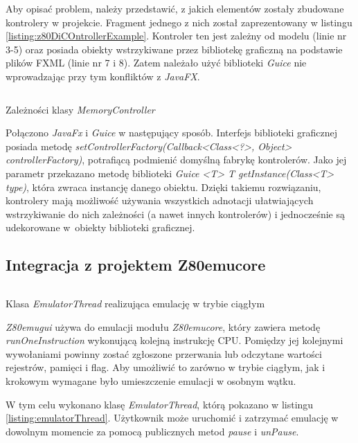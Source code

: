 Aby opisać problem, należy przedstawić, z jakich elementów zostały zbudowane kontrolery w projekcie. Fragment jednego z nich został zaprezentowany w listingu \ref{listing:z80DiCOntrollerExample}. Kontroler ten jest zależny od modelu (linie nr 3-5) oraz posiada obiekty wstrzykiwane przez bibliotekę graficzną na podstawie plików FXML (linie nr 7 i 8). Zatem należało użyć biblioteki \emph{Guice} nie wprowadzając przy tym konfliktów z \emph{JavaFX}.

\begin{listing}[h]
	\inputminted{java}{listings/z80emu-gui/DiControllerExample.java}
	\caption{Zależności klasy \emph{MemoryController}}
	\label{listing:z80DiCOntrollerExample}
\end{listing}

Połączono \emph{JavaFx} i \emph{Guice} w następujący sposób. Interfejs biblioteki graficznej posiada metodę \emph{setControllerFactory(Callback<Class<?>, Object> controllerFactory)}, potrafiącą podmienić domyślną fabrykę kontrolerów. Jako jej parametr przekazano metodę biblioteki \emph{Guice} \emph{<T> T getInstance(Class<T> type)}, która zwraca instancję danego obiektu. Dzięki takiemu rozwiązaniu, kontrolery mają możliwość używania wszystkich adnotacji ułatwiających wstrzykiwanie do nich zależności (a nawet innych kontrolerów) i jednocześnie są udekorowane w~obiekty biblioteki graficznej.

\subsection{Integracja z projektem Z80emu{\dywiz}core}

\begin{listing}[h]
	\inputminted{java}{listings/z80emu-gui/EmulatorThread.java}
	\caption{Klasa \emph{EmulatorThread} realizująca emulację w trybie ciągłym}
	\label{listing:emulatorThread}
\end{listing}

\emph{Z80emu{\dywiz}gui} używa do emulacji modułu \emph{Z80emu{\dywiz}core}, który zawiera metodę \emph{runOneInstruction} wykonującą kolejną instrukcję CPU. Pomiędzy jej kolejnymi wywołaniami powinny zostać zgłoszone przerwania lub odczytane wartości rejestrów, pamięci i flag. Aby umożliwić to zarówno w trybie ciągłym, jak i krokowym wymagane było umieszczenie emulacji w osobnym wątku.

W tym celu wykonano klasę \emph{EmulatorThread}, którą pokazano w listingu \ref{listing:emulatorThread}. Użytkownik może uruchomić i zatrzymać emulację w dowolnym momencie za pomocą publicznych metod \emph{pause} i \emph{unPause}.


